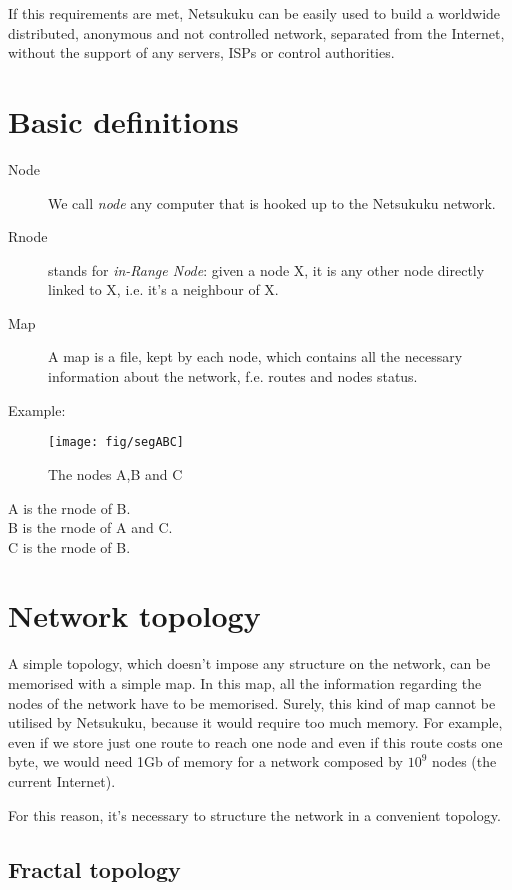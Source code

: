 \documentclass[a4paper]{article}
\begin{document}
If this requirements are met, Netsukuku can be easily used to build a worldwide
distributed, anonymous and not controlled network, separated from the
Internet, without the support of any servers, ISPs or control authorities.

\section{Basic definitions}

\begin{description}
	\item[Node] We call \emph{node} any computer that is hooked up to the
		Netsukuku network.
	\item[Rnode] stands for \emph{in-Range Node}: given a node X, it is any other
		node directly linked to X, i.e. it's a neighbour of X.
	\item[Map] A map is a file, kept by each node, which contains all the
		necessary information about the network, f.e. routes and nodes
		status.
\end{description}
Example:\\
\begin{figure}[h]
	\begin{center}
		\texttt{[image: fig/segABC]}
	\end{center}
	\caption{The nodes A,B and C}
\end{figure}
A is the rnode of B.\\
B is the rnode of A and C.\\
C is the rnode of B.

\section{Network topology}
\label{sec:net_topology}

A simple topology, which doesn't impose any structure on the network, can be
memorised with a simple map. In this map, all the information regarding the
nodes of the network have to be memorised. Surely, this kind of map cannot be
utilised by Netsukuku, because it would require too much memory.
For example, even if we store just one route to reach one node and even if
this route costs one byte, we would need 1Gb of memory for a network composed
by $10^9$ nodes (the current Internet).

For this reason, it's necessary to structure the network in a convenient
topology.

\subsection{Fractal topology}
\label{sec:fractal_topology}
\end{document}
